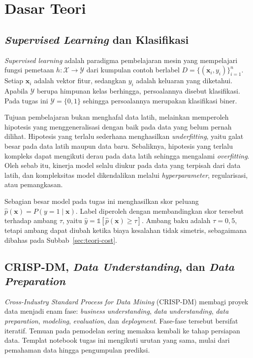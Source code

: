 \clearpage
\section{Dasar Teori}
\subsection{\textit{Supervised Learning} dan Klasifikasi}
\textit{Supervised learning} adalah paradigma pembelajaran mesin yang mempelajari fungsi pemetaan $h:\mathcal{X}\rightarrow\mathcal{Y}$ dari kumpulan contoh berlabel $D=\{(\mathbf{x}_i,y_i)\}_{i=1}^{n}$. Setiap $\mathbf{x}_i$ adalah vektor fitur, sedangkan $y_i$ adalah keluaran yang diketahui. Apabila $\mathcal{Y}$ berupa himpunan kelas berhingga, persoalannya disebut klasifikasi. Pada tugas ini $\mathcal{Y}=\{0,1\}$ sehingga persoalannya merupakan klasifikasi biner.

Tujuan pembelajaran bukan menghafal data latih, melainkan memperoleh hipotesis yang menggeneralisasi dengan baik pada data yang belum pernah dilihat. Hipotesis yang terlalu sederhana menghasilkan \textit{underfitting}, yaitu galat besar pada data latih maupun data baru. Sebaliknya, hipotesis yang terlalu kompleks dapat mengikuti derau pada data latih sehingga mengalami \textit{overfitting}. Oleh sebab itu, kinerja model selalu diukur pada data yang terpisah dari data latih, dan kompleksitas model dikendalikan melalui \textit{hyperparameter}, regularisasi, atau pemangkasan.

Sebagian besar model pada tugas ini menghasilkan skor peluang $\hat{p}(\mathbf{x})=P(y=1\mid\mathbf{x})$. Label diperoleh dengan membandingkan skor tersebut terhadap ambang $\tau$, yaitu $\hat{y}=\mathbb{1}[\hat{p}(\mathbf{x})\geq\tau]$. Ambang baku adalah $\tau=0{,}5$, tetapi ambang dapat diubah ketika biaya kesalahan tidak simetris, sebagaimana dibahas pada Subbab~\ref{sec:teori-cost}.

\subsection{CRISP-DM, \textit{Data Understanding}, dan \textit{Data Preparation}}
\textit{Cross-Industry Standard Process for Data Mining} (CRISP-DM) membagi proyek data menjadi enam fase: \textit{business understanding}, \textit{data understanding}, \textit{data preparation}, \textit{modeling}, \textit{evaluation}, dan \textit{deployment}. Fase-fase tersebut bersifat iteratif. Temuan pada pemodelan sering memaksa kembali ke tahap persiapan data. Templat notebook tugas ini mengikuti urutan yang sama, mulai dari pemahaman data hingga pengumpulan prediksi.

